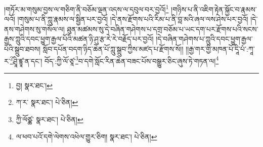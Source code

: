 །གཏོར་མ་གསུམ་བྱས་ལ་གཅིག་ནི་བཅོམ་ལྡན་འདས་ལ་དབུལ་བར་བྱའོ།\footnote{བྱ།  སྣར་ཐང་། } །གཉིས་པ་ནི་འཇིག་རྟེན་སྐྱོང་བ་རྣམས་ལའོ། །གསུམ་པ་ནི་ཀླུ་རྣམས་ལ་སྦྱིན་པར་བྱའོ། །དེ་ནས་རྫོགས་པའི་རིམ་པ་ནི་བླ་མའི་ཞལ་ལས་ཤེས་པར་བྱའོ། །དེ་ནས་གཤེགས་སུ་གསོལ་ལ། ཐུན་མཚམས་སུ་དེ་བཞིན་གཤེགས་པ་དགྲ་བཅོམ་པ་ཡང་དག་པར་རྫོགས་པའི་སངས་རྒྱས་ཀླུའི་དབང་ཕྱུག་རྒྱལ་པོའི་མཚན་ཉི་ཤུ་རྩ་རེ་རེ་བརྗོད་པར་བྱའོ། །དེ་བཞིན་གཤེགས་པ་ཀླུའི་དབང་ཕྱུག་རྒྱལ་པོའི་སྒྲུབ་ཐབས། སློབ་དཔོན་བདག་ཉིད་ཆེན་པོ་ཀླུ་སྒྲུབ་ཀྱིས་མཛད་པ་རྫོགས་སོ།། །།རྒྱ་གར་གྱི་མཁན་པོ་དཱི་པཾ་:ཀཱ་ར་\footnote{ཀ་ར་  སྣར་ཐང་།  པེ་ཅིན། }ཤྲཱི་ཛྙཱ་ན་དང་། བོད་:ཀྱི་ལོ་ཙཱ་\footnote{ཀྱི་ལོཙྪ་  སྣར་ཐང་།  པེ་ཅིན། }བ་དགེ་སློང་རིན་ཆེན་བཟང་པོས་བསྒྱུར་ཅིང་ཞུས་ཏེ་གཏན་ལ།\footnote{ལ་ཕབ་པའོ་དགེ་ལེགས་འཕེལ་གྱུར་ཅིག།  སྣར་ཐང་།  པེ་ཅིན། } 